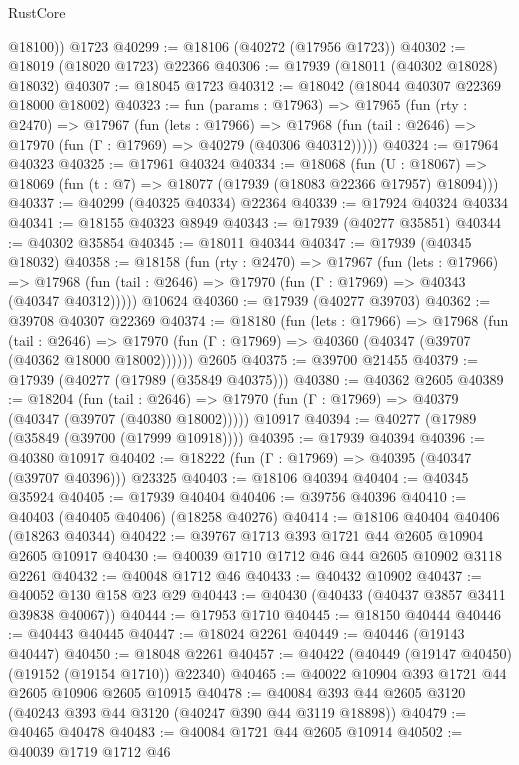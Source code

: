 \begin{lexlean}{RustCore}
\begin{coremodule}
        @18100))
    @1723
@40299 := @18106 (@40272 (@17956 @1723))
@40302 := @18019 (@18020 @1723) @22366
@40306 := @17939 (@18011 (@40302 @18028) @18032)
@40307 := @18045 @1723
@40312 := @18042 (@18044 @40307 @22369 @18000 @18002)
@40323 := fun (params : @17963) =>
  @17965
    (fun (rty : @2470) =>
    @17967
      (fun (lets : @17966) =>
      @17968 (fun (tail : @2646) => @17970 (fun (Γ : @17969) => @40279 (@40306 @40312)))))
@40324 := @17964 @40323
@40325 := @17961 @40324
@40334 := @18068
    (fun (U : @18067) => @18069 (fun (t : @7) => @18077 (@17939 (@18083 @22366 @17957) @18094)))
@40337 := @40299 (@40325 @40334) @22364
@40339 := @17924 @40324 @40334
@40341 := @18155 @40323 @8949
@40343 := @17939 (@40277 @35851)
@40344 := @40302 @35854
@40345 := @18011 @40344
@40347 := @17939 (@40345 @18032)
@40358 := @18158
    (fun (rty : @2470) =>
    @17967
      (fun (lets : @17966) =>
      @17968 (fun (tail : @2646) => @17970 (fun (Γ : @17969) => @40343 (@40347 @40312)))))
    @10624
@40360 := @17939 (@40277 @39703)
@40362 := @39708 @40307 @22369
@40374 := @18180
    (fun (lets : @17966) =>
    @17968
      (fun (tail : @2646) =>
      @17970 (fun (Γ : @17969) => @40360 (@40347 (@39707 (@40362 @18000 @18002))))))
    @2605
@40375 := @39700 @21455
@40379 := @17939 (@40277 (@17989 (@35849 @40375)))
@40380 := @40362 @2605
@40389 := @18204
    (fun (tail : @2646) => @17970 (fun (Γ : @17969) => @40379 (@40347 (@39707 (@40380 @18002)))))
    @10917
@40394 := @40277 (@17989 (@35849 (@39700 (@17999 @10918))))
@40395 := @17939 @40394
@40396 := @40380 @10917
@40402 := @18222 (fun (Γ : @17969) => @40395 (@40347 (@39707 @40396))) @23325
@40403 := @18106 @40394
@40404 := @40345 @35924
@40405 := @17939 @40404
@40406 := @39756 @40396
@40410 := @40403 (@40405 @40406) (@18258 @40276)
@40414 := @18106 @40404 @40406 (@18263 @40344)
@40422 := @39767 @1713 @393 @1721 @44 @2605 @10904 @2605 @10917
@40430 := @40039 @1710 @1712 @46 @44 @2605 @10902 @3118 @2261
@40432 := @40048 @1712 @46
@40433 := @40432 @10902
@40437 := @40052 @130 @158 @23 @29
@40443 := @40430 (@40433 (@40437 @3857 @3411 @39838 @40067))
@40444 := @17953 @1710
@40445 := @18150 @40444
@40446 := @40443 @40445
@40447 := @18024 @2261
@40449 := @40446 (@19143 @40447)
@40450 := @18048 @2261
@40457 := @40422 (@40449 (@19147 @40450) (@19152 (@19154 @1710)) @22340)
@40465 := @40022 @10904 @393 @1721 @44 @2605 @10906 @2605 @10915
@40478 := @40084 @393 @44 @2605 @3120 (@40243 @393 @44 @3120 (@40247 @390 @44 @3119 @18898))
@40479 := @40465 @40478
@40483 := @40084 @1721 @44 @2605 @10914
@40502 := @40039
    @1719
    @1712
    @46

\end{coremodule}
\end{lexlean}
